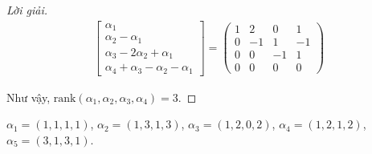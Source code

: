 \documentclass[class=linearalgebra,crop=false]{standalone}
\begin{document}
\begin{proof}[Lời giải]
\begin{align*}
\begin{bmatrix}
            \alpha_{1}                            \\
            \alpha_{2} - \alpha_{1}               \\
            \alpha_{3} - 2\alpha_{2} + \alpha_{1} \\
            \alpha_{4} + \alpha_{3} -\alpha_{2} - \alpha_{1}
        \end{bmatrix}=
        \begin{pmatrix}
            1 & 2  & 0  & 1  \\
            0 & -1 & 1  & -1 \\
            0 & 0  & -1 & 1  \\
            0 & 0  & 0  & 0
        \end{pmatrix}
    \end{align*}
    \par Như vậy, $\text{rank}(\alpha_{1},\alpha_{2},\alpha_{3},\alpha_{4}) = 3$.
\end{proof}

\begin{exercise}
    $\alpha_{1} = (1,1,1,1)$, $\alpha_{2} = (1,3,1,3)$, $\alpha_{3} = (1,2,0,2)$, $\alpha_{4} = (1,2,1,2)$, $\alpha_{5} = (3,1,3,1)$.
\end{exercise}
\end{document}
